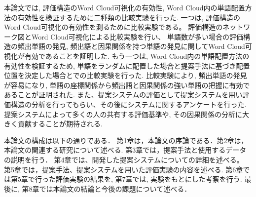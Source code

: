 \documentclass[syuuron]{kuee}
\begin{document}
	本論文では, 評価構造のWord Cloud可視化の有効性, Word Cloud内の単語配置方法の有効性を検証するために二種類の比較実験を行った. 
	一つは, 評価構造のWord Cloud可視化の有効性を測るために比較実験である。 
	評価構造のネットワーク図とWord Cloud可視化による比較実験を行い、
	単語数が多い場合の評価構造の頻出単語の発見, 頻出語と因果関係を持つ単語の発見に関してWord Cloud可視化が有効であることを証明した. 
	もう一つは, Word Cloud内の単語配置方法の有効性を検証するため, 
	単語をランダムに配置した場合と提案手法に基づき配置位置を決定した場合とでの比較実験を行った. 
	比較実験により, 頻出単語の発見が容易になり, 単語の座標関係から頻出語と因果関係の強い単語の把握に有効であることが証明された. 
	また、提案システムの評価として提案システムを用い評価構造の分析を行ってもらい、その後にシステムに関するアンケートを行った. 
	提案システムによって多くの人の共有する評価基準や, その因果関係の分析に大きく貢献することが期待される. 

	本論文の構成は以下の通りである．
	第1章は，本論文の序論である．第2章は，本論文の関連する研究について述べる. 第3章では，提案手法と使用するデータの説明を行う．
	第4章では、開発した提案システムについての詳細を述べる。
	第5章では，提案手法、提案システムを用いた評価実験の内容を述べる. 
	第6章では第5章で行った評価実験の結果を, 第7章では, 実験をもとにした考察を行う. 
	最後に, 第8章では本論文の結論と今後の課題について述べる．
\end{document}

